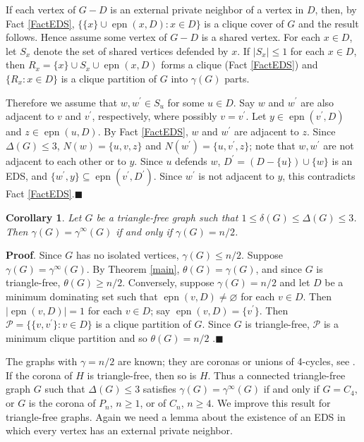 \documentclass[12pt]{article}%
\newtheorem{corollary}[theorem]{Corollary}
\begin{document}
If each vertex of $G-D$ is an external private neighbor of a vertex in $D$,
then, by Fact \ref{FactEDS}, $\{\{x\}\cup\operatorname{epn}(x,D):x\in D\}$ is
a clique cover of $G$ and the result follows. Hence assume some vertex of
$G-D$ is a shared vertex. For each $x\in D$, let $S_{x}$ denote the set of
shared vertices defended by $x$. If $|S_{x}|\leq1$ for each $x\in D$, then
$R_{x}=\{x\}\cup S_{x}\cup\operatorname{epn}(x,D)$ forms a clique (Fact
\ref{FactEDS}) and $\{R_{x}:x\in D\}$ is a clique partition of $G$ into
$\gamma(G)$ parts.

Therefore we assume that $w,w^{\prime}\in S_{u}$ for some $u\in D$. Say $w$
and $w^{\prime}$ are also adjacent to $v$ and $v^{\prime}$, respectively,
where possibly $v=v^{\prime}$. Let $y\in\operatorname{epn}(v^{\prime},D)$ and
$z\in\operatorname{epn}(u,D)$. By Fact \ref{FactEDS}, $w$ and $w^{\prime}$ are
adjacent to $z$. Since $\Delta(G)\leq3$, $N(w)=\{u,v,z\}$ and $N(w^{\prime
})=\{u,v^{\prime},z\}$; note that $w,w^{\prime}$ are not adjacent to each
other or to $y$. Since $u$ defends $w$, $D^{\prime}=(D-\{u\})\cup\{w\}$ is an
EDS, and $\{w^{\prime},y\}\subseteq\operatorname{epn}(v^{\prime},D^{\prime})$.
Since $w^{\prime}$ is not adjacent to $y$, this contradicts Fact
\ref{FactEDS}.\hfill$\blacksquare$

\begin{corollary}
\label{CorK3_free}Let $G$ be a triangle-free graph such that $1\leq
\delta(G)\leq\Delta(G)\leq3$. Then $\gamma(G)=\gamma^{\infty}(G)$ if and only
if $\gamma(G)=n/2$.
\end{corollary}

\noindent\textbf{Proof}.\hspace{0.1in} Since $G$ has no isolated vertices,
$\gamma(G)\leq n/2$. Suppose $\gamma(G)=\gamma^{\infty}(G)$. By Theorem
\ref{main}, $\theta(G)=\gamma(G)$, and since $G$ is triangle-free,
$\theta(G)\geq n/2$. Conversely, suppose $\gamma(G)=n/2$ and let $D$ be a
minimum dominating set such that $\operatorname{epn}(v,D)\neq\varnothing$ for
each $v\in D$. Then $|\operatorname{epn}(v,D)|=1$ for each $v\in D$; say
$\operatorname{epn}(v,D)=\{v^{\prime}\}$. Then $\mathcal{P}=\{\{v,v^{\prime
}\}:v\in D\}$ is a clique partition of $G$. Since $G$ is triangle-free,
$\mathcal{P}$ is a minimum clique partition and so $\theta(G)=n/2$
.\hfill$\blacksquare$

\bigskip

The graphs with $\gamma=n/2$ are known; they are coronas or unions of
4-cycles, see \cite{HHS}. If the corona of $H$ is triangle-free, then so is
$H$. Thus a connected triangle-free graph $G$ such that $\Delta(G)\leq3$
satisfies $\gamma(G)=\gamma^{\infty}(G)$ if and only if $G=C_{4}$, or $G$ is
the corona of $P_{n}$, $n\geq1$, or of $C_{n}$, $n\geq4$. We improve this
result for triangle-free graphs. Again we need a lemma about the existence of
an EDS in which every vertex has an external private neighbor.
\end{document}
